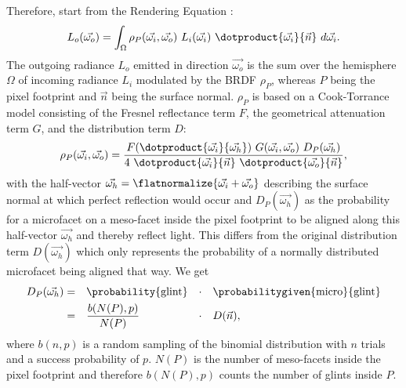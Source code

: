 Therefore, \textcite{deliot2023} start from the Rendering Equation \parencite{kajiya1986, immel1986}:
%
\begin{equation}
    L_o(\vec{\omega_o}) =
    \int_{\Omega}
        \rho_P(\vec{\omega_i}, \vec{\omega_o})~
        L_i(\vec{\omega_i})~
        \dotproduct{\vec{\omega_i}}{\vec{n}}~
    d\vec{\omega_i}.
\end{equation}
%
The outgoing radiance $L_o$ emitted in direction $\vec{\omega_o}$ is the sum over the hemisphere $\Omega$ of incoming radiance $L_i$ modulated by the BRDF $\rho_P$, whereas $P$ being the pixel footprint and $\vec{n}$ being the surface normal.
%
$\rho_P$ is based on a Cook-Torrance model \parencite{cook1982} consisting of the Fresnel reflectance term $F$, the geometrical attenuation term $G$, and the distribution term $D$:
%
\begin{equation}
    \rho_P(\vec{\omega_i}, \vec{\omega_o}) = \frac{
        F(\dotproduct{\vec{\omega_i}}{\vec{\omega_h}})~
        G(\vec{\omega_i}, \vec{\omega_o})~
        D_P(\vec{\omega_h})
    }{
        4~
        \dotproduct{\vec{\omega_i}}{\vec{n}}~
        \dotproduct{\vec{\omega_o}}{\vec{n}}
    },
\end{equation}
%
with the half-vector $\vec{\omega_h}=\flatnormalize{\vec{\omega_i} + \vec{\omega_o}}$ describing the surface normal at which perfect reflection would occur and $D_P(\vec{\omega_h})$ as the probability for a microfacet on a meso-facet inside the pixel footprint to be aligned along this half-vector $\vec{\omega_h}$ and thereby reflect light.
%
This differs from the original distribution term $D(\vec{\omega_h})$ which only represents the probability of a normally distributed microfacet being aligned that way. We get
%
\begin{equation}
\begin{aligned}
    D_P(\vec{\omega_h})
    & = && \probability{\mathrm{glint}} && \cdot && \probabilitygiven{\mathrm{micro}}{\mathrm{glint}} \\
    & = && \frac{b(N(P), p)}{N(P)} && \cdot && D(\vec{n}),
\end{aligned}
\end{equation}
%
where $b(n, p)$ is a random sampling of the binomial distribution with $n$ trials and a success probability of $p$. $N(P)$ is the number of meso-facets inside the pixel footprint and therefore $b(N(P), p)$ counts the number of glints inside $P$.

